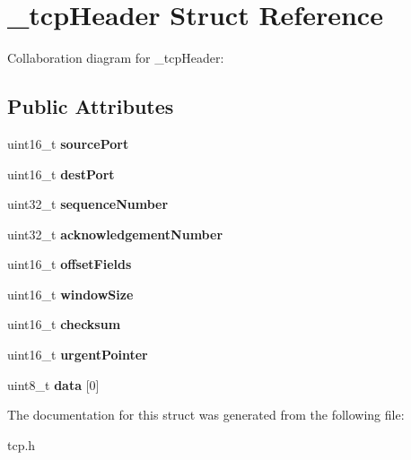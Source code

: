 \hypertarget{struct__tcpHeader}{}\section{\+\_\+tcp\+Header Struct Reference}
\label{struct__tcpHeader}


Collaboration diagram for \+\_\+tcp\+Header\+:
\subsection*{Public Attributes}
\begin{DoxyCompactItemize}
\item 
\mbox{\label{struct__tcpHeader_adab3cbb36f879d6bbb9511cbed24b7a5}} 
uint16\+\_\+t {\bfseries source\+Port}
\item 
\mbox{\label{struct__tcpHeader_a5484a2aa2e860b1f226a7014ae402d3e}} 
uint16\+\_\+t {\bfseries dest\+Port}
\item 
\mbox{\label{struct__tcpHeader_a5441a14212cd0e07d20b95ce8198db27}} 
uint32\+\_\+t {\bfseries sequence\+Number}
\item 
\mbox{\label{struct__tcpHeader_a99a7268547ba31c3fe8e44933d435389}} 
uint32\+\_\+t {\bfseries acknowledgement\+Number}
\item 
\mbox{\label{struct__tcpHeader_ad3fe63661ec8dea7e4a46bf010788384}} 
uint16\+\_\+t {\bfseries offset\+Fields}
\item 
\mbox{\label{struct__tcpHeader_ab3caec0ac5bef36c592a52b800f73e5b}} 
uint16\+\_\+t {\bfseries window\+Size}
\item 
\mbox{\label{struct__tcpHeader_a0906fe118aa70365e0820e171c75119b}} 
uint16\+\_\+t {\bfseries checksum}
\item 
\mbox{\label{struct__tcpHeader_a971349f17dd591d019c1e12c1454998f}} 
uint16\+\_\+t {\bfseries urgent\+Pointer}
\item 
\mbox{\label{struct__tcpHeader_aede9eb26ef4f1a85dc3491029ee4baac}} 
uint8\+\_\+t {\bfseries data} \mbox{[}0\mbox{]}
\end{DoxyCompactItemize}


The documentation for this struct was generated from the following file\+:\begin{DoxyCompactItemize}
\item 
tcp.\+h\end{DoxyCompactItemize}
